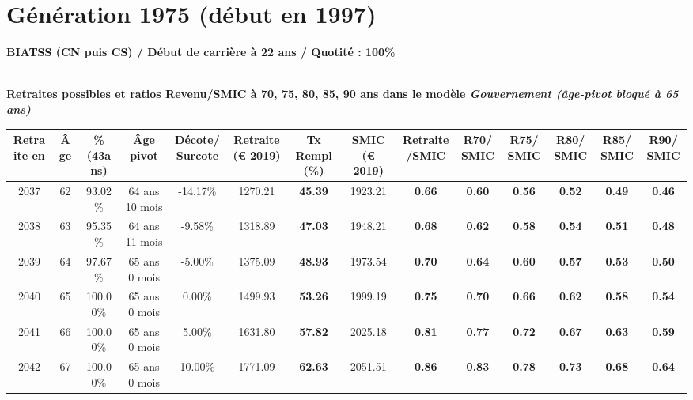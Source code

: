  \newpage 

\section{Génération 1975 (début en 1997)\label{BIATSS_100_22_1975_0}} 
 
{\bf \noindent BIATSS (CN puis CS) / Début de carrière à 22 ans / Quotité : 100\%}  ~ 

 ~\\{\bf \noindent Retraites possibles et ratios Revenu/SMIC à 70, 75, 80, 85, 90 ans dans le modèle \emph{Gouvernement (âge-pivot bloqué à 65 ans)}}  
 
\begin{adjustbox}{max width=\textwidth} 
\begin{tabular}[htb]{|c|c||c|c|c||c|c||c|c||c|c|c|c|c|} 
\hline 
 Retraite en &  Âge &  \%(43ans) &  Âge pivot &  Décote/Surcote &  Retraite (\euro{} 2019) &  Tx Rempl(\%) &  SMIC (\euro{} 2019) &  Retraite/SMIC &  R70/SMIC &  R75/SMIC &  R80/SMIC &  R85/SMIC &  R90/SMIC \\ 
\hline \hline 
 2037 &  62 &  93.02\% &  64 ans 10 mois &  -14.17\% &  1270.21 &  {\bf 45.39} &  1923.21 &  {\bf {\color{red} 0.66}} &  {\bf {\color{red} 0.60}} &  {\bf {\color{red} 0.56}} &  {\bf {\color{red} 0.52}} &  {\bf {\color{red} 0.49}} &  {\bf {\color{red} 0.46}} \\ 
\hline 
 2038 &  63 &  95.35\% &  64 ans 11 mois &  -9.58\% &  1318.89 &  {\bf 47.03} &  1948.21 &  {\bf {\color{red} 0.68}} &  {\bf {\color{red} 0.62}} &  {\bf {\color{red} 0.58}} &  {\bf {\color{red} 0.54}} &  {\bf {\color{red} 0.51}} &  {\bf {\color{red} 0.48}} \\ 
\hline 
 2039 &  64 &  97.67\% &  65 ans 0 mois &  -5.00\% &  1375.09 &  {\bf 48.93} &  1973.54 &  {\bf {\color{red} 0.70}} &  {\bf {\color{red} 0.64}} &  {\bf {\color{red} 0.60}} &  {\bf {\color{red} 0.57}} &  {\bf {\color{red} 0.53}} &  {\bf {\color{red} 0.50}} \\ 
\hline 
 2040 &  65 &  100.00\% &  65 ans 0 mois &  0.00\% &  1499.93 &  {\bf 53.26} &  1999.19 &  {\bf {\color{red} 0.75}} &  {\bf {\color{red} 0.70}} &  {\bf {\color{red} 0.66}} &  {\bf {\color{red} 0.62}} &  {\bf {\color{red} 0.58}} &  {\bf {\color{red} 0.54}} \\ 
\hline 
 2041 &  66 &  100.00\% &  65 ans 0 mois &  5.00\% &  1631.80 &  {\bf 57.82} &  2025.18 &  {\bf {\color{red} 0.81}} &  {\bf {\color{red} 0.77}} &  {\bf {\color{red} 0.72}} &  {\bf {\color{red} 0.67}} &  {\bf {\color{red} 0.63}} &  {\bf {\color{red} 0.59}} \\ 
\hline 
 2042 &  67 &  100.00\% &  65 ans 0 mois &  10.00\% &  1771.09 &  {\bf 62.63} &  2051.51 &  {\bf {\color{red} 0.86}} &  {\bf {\color{red} 0.83}} &  {\bf {\color{red} 0.78}} &  {\bf {\color{red} 0.73}} &  {\bf {\color{red} 0.68}} &  {\bf {\color{red} 0.64}} \\ 
\hline 
\hline 
\end{tabular} 
\end{adjustbox} 
 
